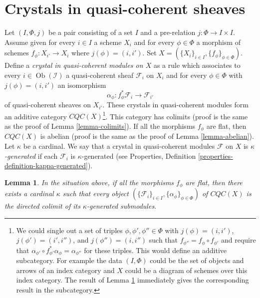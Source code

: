 \documentclass{stacks-project}
\theoremstyle{plain}
\newtheorem{lemma}[subsection]{Lemma}
\theoremstyle{definition}
\theoremstyle{remark}
\numberwithin{equation}{subsection}
\def\Ob{\mathop{\mathrm{Ob}}\nolimits}
\begin{document}
\section{Crystals in quasi-coherent sheaves}
\label{section-crystals}

\noindent
Let $(I, \Phi, j)$ be a pair consisting of a set $I$
and a pre-relation $j : \Phi \to I \times I$. Assume given for every
$i \in I$ a scheme $X_i$ and for every $\phi \in \Phi$
a morphism of schemes $f_\phi : X_{i'} \to X_i$ where
$j(\phi) = (i, i')$. Set
$X = (\{X_i\}_{i \in I}, \{f_\phi\}_{\phi \in \Phi})$.
Define a {\it crystal in quasi-coherent modules on $X$}
as a rule which associates to every
$i \in \Ob(\mathcal{I})$ a quasi-coherent sheaf $\mathcal{F}_i$ on $X_i$
and for every $\phi \in \Phi$ with $j(\phi) = (i, i')$ an isomorphism
$$
\alpha_\phi : f_\phi^*\mathcal{F}_i \longrightarrow \mathcal{F}_{i'}
$$
of quasi-coherent sheaves on $X_{i'}$. These crystals in quasi-coherent
modules form an additive category $\textit{CQC}(X)$\footnote{We could single
out a set of triples $\phi, \phi', \phi'' \in \Phi$ with
$j(\phi) = (i, i')$, $j(\phi') = (i', i'')$, and $j(\phi'') = (i, i'')$
such that $f_{\phi''} = f_\phi \circ f_{\phi'}$ and require that
$\alpha_{\phi'} \circ f_{\phi'}^*\alpha_\phi = \alpha_{\phi''}$
for these triples. This would define an additive subcategory.
For example the data $(I, \Phi)$ could be the set of objects and
arrows of an index category and $X$ could be a diagram of schemes over
this index category. The result of
Lemma \ref{lemma-crystals-in-quasi-coherent-modules}
immediately gives the corresponding result in the subcategory.}.
This category has colimits
(proof is the same as the proof of Lemma \ref{lemma-colimits}).
If all the morphisms $f_\phi$ are flat, then $\textit{CQC}(X)$ is
abelian (proof is the same as the proof of Lemma \ref{lemma-abelian}).
Let $\kappa$ be a cardinal. We say that a crystal in quasi-coherent modules
$\mathcal{F}$ on $X$ is {\it $\kappa$-generated} if each $\mathcal{F}_i$ is
$\kappa$-generated (see
Properties, Definition \ref{properties-definition-kappa-generated}).

\begin{lemma}
\label{lemma-crystals-in-quasi-coherent-modules}
In the situation above, if all the morphisms $f_\phi$ are flat, then there
exists a cardinal $\kappa$ such that every object
$(\{\mathcal{F}_i\}_{i \in I}, \{\alpha_\phi\}_{\phi \in \Phi})$
of $\textit{CQC}(X)$ is the directed colimit of its
$\kappa$-generated submodules.
\end{lemma}
\end{document}
